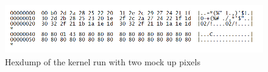 %
\begin{figure}[h] %
\centering
\includegraphics[height=80px]{Pictures/hextest}%
\caption{Hexdump of the kernel run with two mock up pixels}%
\label{fig:testhex}%
\end{figure}
%

